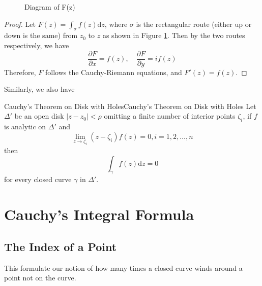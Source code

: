 \documentclass[../main.tex]{subfiles}
\begin{document}
\begin{figure}[ht]
    \centering
    \caption{Diagram of F(z)}
    \label{fig:diagram-of-f(z)}
\end{figure}

\begin{proof}
	Let $\displaystyle F(z) = \int_{\sigma} f(z)\mathrm{d} z$, where $\sigma$ is the rectangular route (either up or down is the same) from $z_0$ to $z$ as shown in Figure \ref{fig:diagram-of-f(z)}. Then by the two routes respectively, we have
	\begin{equation*}
		\frac{\partial F}{\partial x} = f(z), \quad \frac{\partial F}{\partial y} = i f(z)
	\end{equation*}
	Therefore, $F$ follows the Cauchy-Riemann equations, and $F'(z) = f(z)$.
\end{proof}
Similarly, we also have
\begin{theorem}{Cauchy's Theorem on Disk with Holes}{Cauchy's Theorem on Disk with Holes}
	Let $\Delta'$ be an open disk $\left|z-z_0\right|<\rho$ omitting a finite number of interior points $\zeta_i$, if $f$ is analytic on $\Delta'$ and
	\begin{equation*}
		\lim_{z \to \zeta_i} (z-\zeta_i) f(z) = 0, i=1,2,\ldots,n
	\end{equation*}
	then
	\begin{equation*}
		\int_{\gamma} f(z) \mathrm{d} z = 0
	\end{equation*}
	for every closed curve $\gamma$ in $\Delta'$.
\end{theorem}

\section{Cauchy's Integral Formula}

\subsection{The Index of a Point}
This formulate our notion of how many times a closed curve winds around a point not on the curve.
\end{document}
